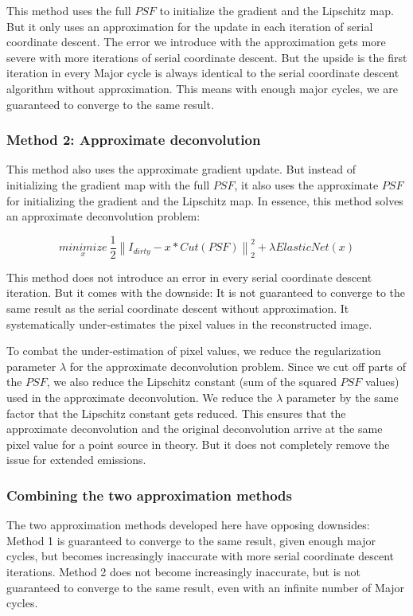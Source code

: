 This method uses the full $PSF$ to initialize the gradient and the Lipschitz map. But it only uses an approximation for the update in each iteration of serial coordinate descent. The error we introduce with the approximation gets more severe with more iterations of serial coordinate descent. But the upside is the first iteration in every Major cycle is always identical to the serial coordinate descent algorithm without approximation. This means with enough major cycles, we are guaranteed to converge to the same result.


\subsubsection{Method 2: Approximate deconvolution}
This method also uses the approximate gradient update. But instead of initializing the gradient map with the full $PSF$, it also uses the approximate $PSF$ for initializing the gradient and the Lipschitz map. In essence, this method solves an approximate deconvolution problem:

\begin{equation}\label{gradients:method2:objective}
\underset{x}{minimize} \: \frac{1}{2} \left \| I_{dirty} - x * Cut(PSF) \right \|_2^2 + \lambda ElasticNet(x)
\end{equation}

This method does not introduce an error in every serial coordinate descent iteration. But it comes with the downside: It is not guaranteed to converge to the same result as the serial coordinate descent without approximation. It systematically under-estimates the pixel values in the reconstructed image.

To combat the under-estimation of pixel values, we reduce the regularization parameter $\lambda$ for the approximate deconvolution problem. Since we cut off parts of the $PSF$, we also reduce the Lipschitz constant (sum of the squared $PSF$ values) used in the approximate deconvolution. We reduce the $\lambda$ parameter by the same factor that the Lipschitz constant gets reduced. This ensures that the approximate deconvolution and the original deconvolution arrive at the same pixel value for a point source in theory. But it does not completely remove the issue for extended emissions.


\subsubsection{Combining the two approximation methods}
The two approximation methods developed here have opposing downsides: Method 1 is guaranteed to converge to the same result, given enough major cycles, but becomes increasingly inaccurate with more serial coordinate descent iterations. Method 2 does not become increasingly inaccurate, but is not guaranteed to converge to the same result, even with an infinite number of Major cycles.

